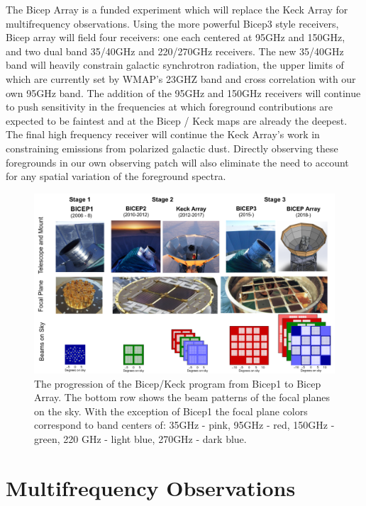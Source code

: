 \documentclass[12pt]{article}
\begin{document}
The Bicep Array is a funded experiment which will replace the Keck Array for
multifrequency observations. Using the more powerful Bicep3 style receivers,
Bicep array will field four receivers: one each centered at 95GHz and 150GHz,
and two dual band 35/40GHz and 220/270GHz receivers. The new 35/40GHz band will
heavily constrain galactic synchrotron radiation, the upper limits of
which are currently set by WMAP's 23GHZ band and cross correlation with our
own 95GHz band. The addition of the 95GHz and 150GHz receivers will continue
to push sensitivity in the frequencies at which foreground contributions are
expected to be faintest and at the Bicep / Keck maps are already the deepest.
The final high frequency receiver will continue the Keck Array's work in
constraining emissions from polarized galactic dust. Directly observing
these foregrounds in our own observing patch will also eliminate the  need to
account for any spatial variation of the foreground spectra.



\begin{figure}
	\center
	\includegraphics[width=.8\textwidth]{BK_progression.png}
	\caption{The progression of the Bicep/Keck program from Bicep1 to Bicep
	Array. The bottom row shows the beam patterns of the focal planes on the
	sky. With the exception of Bicep1 the focal plane colors correspond to
	band centers of: 35GHz - pink, 95GHz - red, 150GHz - green, 220 GHz -
	light blue, 270GHz - dark blue.}
	\label{fig:BK_progression}
\end{figure}




\section{Multifrequency Observations}
\end{document}
